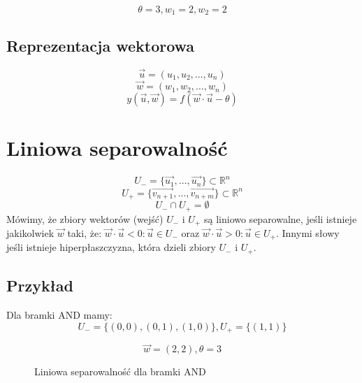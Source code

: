 \documentclass{../notatki}
\begin{document}
$$
\theta = 3, w_1 = 2, w_2 = 2
$$

\subsection{Reprezentacja wektorowa}

$$
\vec{u} = (u_1, u_2, \ldots, u_n)
$$
$$
\vec{w} = (w_1, w_2, \ldots, w_n)
$$
$$
y(\vec{u}, \vec{w}) = f(\vec{w} \cdot \vec{u} - \theta)
$$

\section{Liniowa separowalność}

$$
U_- = \{\vec{u_1}, \dots, \vec{u_n}\} \subset \mathbb{R}^n
$$
$$
U_+ = \{\vec{v_{n + 1}}, \dots, \vec{v_{n + m}}\} \subset \mathbb{R}^n
$$
$$
U_- \cap U_+ = \emptyset
$$
Mówimy, że zbiory wektorów (wejść) $U_-$ i $U_+$ są liniowo separowalne, jeśli
istnieje jakikolwiek $\vec{w}$ taki, że: $\vec{w} \cdot \vec{u} < 0:
\vec{u} \in U_-$ oraz $\vec{w} \cdot \vec{u} > 0: \vec{u} \in U_+$. Innymi słowy
jeśli istnieje hiperpłaszczyzna, która dzieli zbiory $U_-$ i $U_+$.

\subsection{Przykład}

Dla bramki AND mamy:
$$
U_- = \{(0, 0), (0, 1), (1, 0)\}, U_+ = \{(1, 1)\}
$$

$$
\vec{w} = (2, 2), \theta = 3
$$

\begin{figure*}[h]
  \centering
  \caption{Liniowa separowalność dla bramki AND}
\end{figure*}
\end{document}
